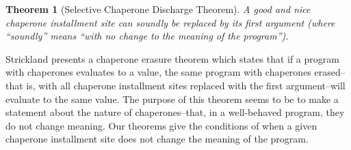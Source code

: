 \documentclass{sigplanconf}
\newtheorem{theorem}{Theorem}
\begin{document}
\begin{theorem}[Selective Chaperone Discharge Theorem]
A good and nice chaperone installment site can soundly be replaced by its first argument (where ``soundly'' means ``with no change to the meaning of the program'').
\end{theorem}





Strickland presents a chaperone erasure theorem which states that if a program with chaperones evaluates to a value, the same program with chaperones erased--that is, with all chaperone installment sites replaced with the first argument--will evaluate to the same value. The purpose of this theorem seems to be to make a statement about the nature of chaperones--that, in a well-behaved program, they do not change meaning. Our theorems give the conditions of when a given chaperone installment site does not change the meaning of the program.





\end{document}
